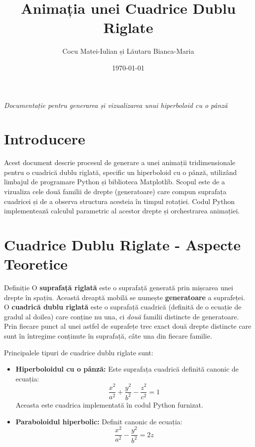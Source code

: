 \documentclass[a4paper,11pt]{article}
\title{\Huge Animația unei Cuadrice Dublu Riglate}
\author{Cocu Matei-Iulian și Lăutaru Bianca-Maria}
\date{\today} %
\begin{document}
\maketitle
\begin{center}
    \textit{Documentație pentru generarea și vizualizarea unui hiperboloid cu o pânză}
\end{center}
\vspace{1cm}

\tableofcontents
\newpage

\section{Introducere}
Acest document descrie procesul de generare a unei animații tridimensionale pentru o cuadrică dublu riglată, specific un hiperboloid cu o pânză, utilizând limbajul de programare Python și biblioteca Matplotlib. Scopul este de a vizualiza cele două familii de drepte (generatoare) care compun suprafața cuadricei și de a observa structura acesteia în timpul rotației. Codul Python implementează calculul parametric al acestor drepte și orchestrarea animației.

\section{Cuadrice Dublu Riglate - Aspecte Teoretice}

\begin{definitionbox}{Definiție}
O \textbf{suprafață riglată} este o suprafață generată prin mișcarea unei drepte în spațiu. Această dreaptă mobilă se numește \textbf{generatoare} a suprafeței.
O \textbf{cuadrică dublu riglată} este o suprafață cuadrică (definită de o ecuație de gradul al doilea) care conține nu una, ci \textit{două} familii distincte de generatoare. Prin fiecare punct al unei astfel de suprafețe trec exact două drepte distincte care sunt în întregime conținute în suprafață, câte una din fiecare familie.
\end{definitionbox}

Principalele tipuri de cuadrice dublu riglate sunt:
\begin{itemize}
    \item \textbf{Hiperboloidul cu o pânză:} Este suprafața cuadrică definită canonic de ecuația:
    \[ \frac{x^2}{a^2} + \frac{y^2}{b^2} - \frac{z^2}{c^2} = 1 \]
    Aceasta este cuadrica implementată în codul Python furnizat.
    \item \textbf{Paraboloidul hiperbolic:} Definit canonic de ecuația:
    \[ \frac{x^2}{a^2} - \frac{y^2}{b^2} = 2z \]
\end{itemize}
\end{document}

